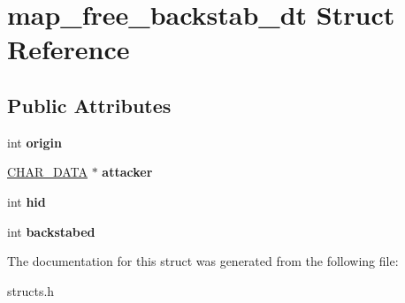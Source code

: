 \hypertarget{structmap__free__backstab__dt}{\section{map\-\_\-free\-\_\-backstab\-\_\-dt Struct Reference}
\label{structmap__free__backstab__dt}
}
\subsection*{Public Attributes}
\begin{DoxyCompactItemize}
\item 
\hypertarget{structmap__free__backstab__dt_ab996734d78f3dd7b36dd46c6b7c12e62}{int {\bfseries origin}}\label{structmap__free__backstab__dt_ab996734d78f3dd7b36dd46c6b7c12e62}

\item 
\hypertarget{structmap__free__backstab__dt_a6304d2a852315acac57974a49aace111}{\hyperlink{structchar__data}{C\-H\-A\-R\-\_\-\-D\-A\-T\-A} $\ast$ {\bfseries attacker}}\label{structmap__free__backstab__dt_a6304d2a852315acac57974a49aace111}

\item 
\hypertarget{structmap__free__backstab__dt_a0338cf2d2c577bd0ab3c3722615da889}{int {\bfseries hid}}\label{structmap__free__backstab__dt_a0338cf2d2c577bd0ab3c3722615da889}

\item 
\hypertarget{structmap__free__backstab__dt_a8ba4127866102f63b8649c64582ad582}{int {\bfseries backstabed}}\label{structmap__free__backstab__dt_a8ba4127866102f63b8649c64582ad582}

\end{DoxyCompactItemize}


The documentation for this struct was generated from the following file\-:\begin{DoxyCompactItemize}
\item 
structs.\-h\end{DoxyCompactItemize}
